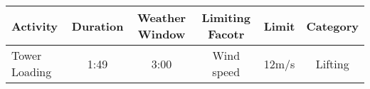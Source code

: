\begin{table}
\label{tab:Sampleinputparameters}
\begin{tabular}{lccccc}
\hline
Activity & Duration & Weather Window & Limiting Facotr & Limit & Category \\
\hline 
Tower Loading & 1:49 & 3:00 & Wind speed & 12m/s & Lifting \\
\hline
\end{tabular}
\end{table}




